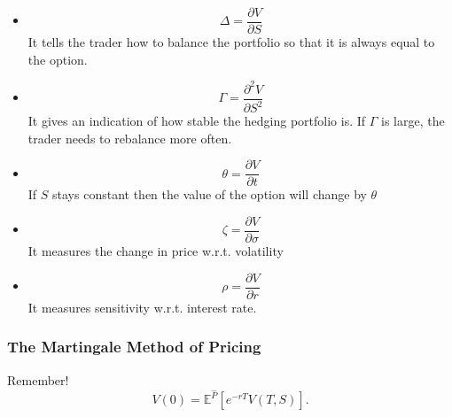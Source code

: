 \documentclass[twocolumn,landscape,10pt]{article}
\theoremstyle{definition}
\begin{document}
\begin{itemize}
    \item 
        \[
            \Delta=\frac{\partial V}{\partial S}
        \]
        It tells the trader how to balance the portfolio so that it is always
        equal to the option.
    \item 
        \[
            \Gamma=\frac{\partial^2 V}{\partial S^2}
        \]
        It gives an indication of how stable the hedging portfolio is. If
        $\Gamma$ is large, the trader needs to rebalance more often.
    \item
        \[
            \theta=\frac{\partial V}{\partial t}
        \]
        If $S$ stays constant then the value of the option will change by
        $\theta$
    \item
        \[
            \zeta=\frac{\partial V}{\partial \sigma}
        \]
        It measures the change in price w.r.t. volatility
    \item
        \[
            \rho=\frac{\partial V}{\partial r}
        \]
        It measures sensitivity w.r.t. interest rate.
\end{itemize}

\subsubsection{The Martingale Method of Pricing}

Remember!
\[
    V(0)=\mathbb{E}^{\hat{P}}\left[e^{-rT}V(T,S)\right].
\]
\end{document}
